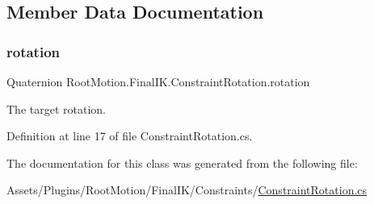 \subsection{Member Data Documentation}
\mbox{\label{class_root_motion_1_1_final_i_k_1_1_constraint_rotation_a5b5e7172beecd33bc7002e853eeb6412}} 
\subsubsection{\texorpdfstring{rotation}{rotation}}
{\footnotesize\ttfamily Quaternion Root\+Motion.\+Final\+I\+K.\+Constraint\+Rotation.\+rotation}



The target rotation. 



Definition at line 17 of file Constraint\+Rotation.\+cs.



The documentation for this class was generated from the following file\+:\begin{DoxyCompactItemize}
\item 
Assets/\+Plugins/\+Root\+Motion/\+Final\+I\+K/\+Constraints/\mbox{\hyperlink{_constraint_rotation_8cs}{Constraint\+Rotation.\+cs}}\end{DoxyCompactItemize}
